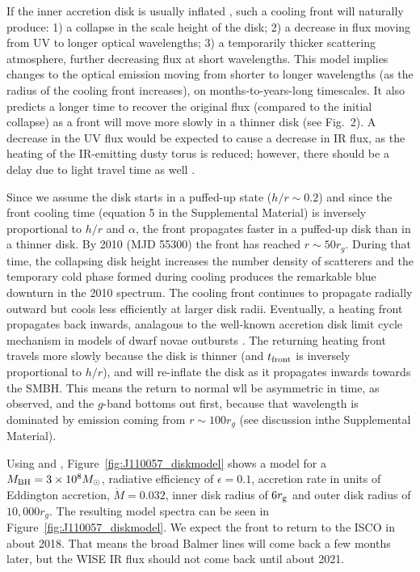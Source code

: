 \documentclass{nature}
\begin{document}
If the inner accretion disk is usually inflated \cite[see e.g.,
][]{Sirko_Goodman2003, Thompson2005, Hopkins_Quataert2011}, such a
cooling front will naturally produce: 1) a collapse in the scale
height of the disk; 2) a decrease in flux moving from UV to longer
optical wavelengths; 3) a temporarily thicker scattering atmosphere,
further decreasing flux at short wavelengths.  This model implies
changes to the optical emission moving from shorter to longer
wavelengths (as the radius of the cooling front increases), on
months-to-years-long timescales. It also predicts a longer time to
recover the original flux (compared to the initial collapse) as a
front will move more slowly in a thinner disk (see Fig.~2). A decrease
in the UV flux would be expected to cause a decrease in IR flux, as
the heating of the IR-emitting dusty torus is reduced; however, there
should be a delay due to light travel time as well \cite[e.g.,
][]{Jun2015}.

Since we assume the disk starts in a puffed-up state ($h/r \sim 0.2$)
and since the front cooling time (equation 5 in the Supplemental
Material) is inversely proportional to $h/r$ and $\alpha$, the front
propagates faster in a puffed-up disk than in a thinner disk. By 2010
(MJD 55300) the front has reached $r\sim50 r_{g}$. During that time,
the collapsing disk height increases the number density of scatterers
and the temporary cold phase formed during cooling produces the
remarkable blue downturn in the 2010 spectrum. The cooling front
continues to propagate radially outward but cools less efficiently at
larger disk radii. Eventually, a heating front propagates back
inwards, analagous to the well-known accretion disk limit cycle
mechanism in models of dwarf novae outbursts \cite[e.g.,
][]{Cannizzo1998}. The returning heating front travels more slowly
because the disk is thinner (and $t_{\rm front}$ is inversely
proportional to $h/r$), and will re-inflate the disk as it propagates
inwards towards the SMBH. This means the return to normal wll be
asymmetric in time, as observed, and the $g$-band bottoms out first,
because that wavelength is dominated by emission coming from
$r\sim100r_{g}$ (see discussion inthe Supplemental Material).

Using \cite{Ford2018} and \cite{Sirko_Goodman2003},
Figure~\ref{fig:J110057_diskmodel} shows a model for a $M_{\rm
BH}=3\times 10^{8} M_{\odot}$, radiative efficiency of $\epsilon=0.1$,
accretion rate in units of Eddington accretion, $\dot{M}=0.032$, inner
disk radius of $6r_{\rm g}$ and outer disk radius of $10,000 r_{g}$. The resulting model spectra can be seen in
Figure~\ref{fig:J110057_diskmodel}.  We expect the front to return to
the ISCO in about 2018. That means the broad Balmer lines will come back a few
months later, but the WISE IR flux should not come back until about
2021.
\end{document}
